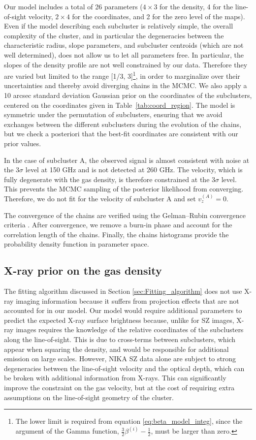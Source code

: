 \documentclass[twocolumn,traditabstract]{aa}
\begin{document}
Our model includes a total of 26 parameters ($4 \times 3$ for the density, 4 for the line-of-sight velocity, $2 \times 4$ for the coordinates, and 2 for the zero level of the maps). Even if the model describing each subcluster is relatively simple, the overall complexity of the cluster, and in particular the degeneracies between the characteristic radius, slope parameters, and subcluster centroids (which are not well determined), does not allow us to let all parameters free. In particular, the slopes of the density profile are not well constrained by our data. Therefore they are varied but limited to the range [1/3, 3]\footnote{The lower limit is required from equation \ref{eq:beta_model_integ}, since the argument of the Gamma function, $\frac{3}{2} \beta^{(i)} -\frac{1}{2}$, must be larger than zero.}, in order to marginalize over their uncertainties and thereby avoid diverging chains in the MCMC. We also apply a 10 arcsec standard deviation Gaussian prior on the coordinates of the subclusters, centered on the coordinates given in Table~\ref{tab:coord_region}. The model is symmetric under the permutation of subclusters, ensuring that we avoid exchanges between the different subclusters during the evolution of the chains, but we check a posteriori that the best-fit coordinates are consistent with our prior values.

In the case of subcluster A, the observed signal is almost consistent with noise at the $3 \sigma$ level at 150 GHz and is not detected at 260 GHz. The velocity, which is fully degenerate with the gas density, is therefore constrained at the $3 \sigma$ level. This prevents the MCMC sampling of the posterior likelihood from converging. Therefore, we do not fit for the velocity of subcluster A and set $v_z^{(A)} = 0$.

The convergence of the chains are verified using the Gelman--Rubin convergence criteria \citep{Gelman1992}. After convergence, we remove a burn-in phase and account for the correlation length of the chains. Finally, the chains histograms provide the probability density function in parameter space.

\subsection{X-ray prior on the gas density}
The fitting algorithm discussed in Section \ref{sec:Fitting_algorithm} does not use X-ray imaging information because it suffers from projection effects that are not accounted for in our model. Our model would require additional parameters to predict the expected X-ray surface brightness because, unlike for SZ images, X-ray images requires the knowledge of the relative coordinates of the subclusters along the line-of-sight. This is due to cross-terms between subclusters, which appear when squaring the density, and would be responsible for additional emission on large scales. However, NIKA SZ data alone are subject to strong degeneracies between the line-of-sight velocity and the optical depth, which can be broken with additional information from X-rays. This can significantly improve the constraint on the gas velocity, but at the cost of requiring extra assumptions on the line-of-sight geometry of the cluster.
\end{document}
